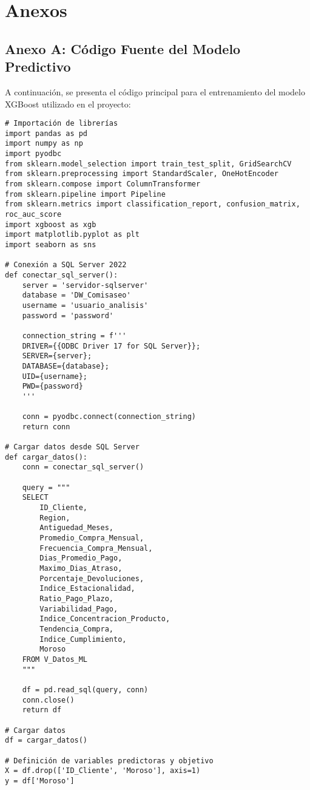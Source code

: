 \chapter{Anexos}

\section{Anexo A: Código Fuente del Modelo Predictivo}

A continuación, se presenta el código principal para el entrenamiento del modelo XGBoost utilizado en el proyecto:

\begin{verbatim}
# Importación de librerías
import pandas as pd
import numpy as np
import pyodbc
from sklearn.model_selection import train_test_split, GridSearchCV
from sklearn.preprocessing import StandardScaler, OneHotEncoder
from sklearn.compose import ColumnTransformer
from sklearn.pipeline import Pipeline
from sklearn.metrics import classification_report, confusion_matrix, roc_auc_score
import xgboost as xgb
import matplotlib.pyplot as plt
import seaborn as sns

# Conexión a SQL Server 2022
def conectar_sql_server():
    server = 'servidor-sqlserver'
    database = 'DW_Comisaseo'
    username = 'usuario_analisis'
    password = 'password'
    
    connection_string = f'''
    DRIVER={{ODBC Driver 17 for SQL Server}};
    SERVER={server};
    DATABASE={database};
    UID={username};
    PWD={password}
    '''
    
    conn = pyodbc.connect(connection_string)
    return conn

# Cargar datos desde SQL Server
def cargar_datos():
    conn = conectar_sql_server()
    
    query = """
    SELECT 
        ID_Cliente,
        Region,
        Antiguedad_Meses,
        Promedio_Compra_Mensual,
        Frecuencia_Compra_Mensual,
        Dias_Promedio_Pago,
        Maximo_Dias_Atraso,
        Porcentaje_Devoluciones,
        Indice_Estacionalidad,
        Ratio_Pago_Plazo,
        Variabilidad_Pago,
        Indice_Concentracion_Producto,
        Tendencia_Compra,
        Indice_Cumplimiento,
        Moroso
    FROM V_Datos_ML
    """
    
    df = pd.read_sql(query, conn)
    conn.close()
    return df

# Cargar datos
df = cargar_datos()

# Definición de variables predictoras y objetivo
X = df.drop(['ID_Cliente', 'Moroso'], axis=1)
y = df['Moroso']


\end{verbatim}
